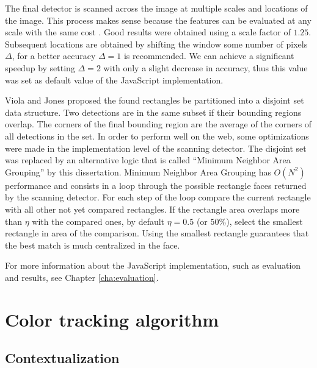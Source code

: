 The final detector is scanned across the image at multiple scales and locations of the image. This process makes sense because the features can be evaluated at any scale with the same cost \cite{Viola2001}. Good results were obtained using a scale factor of $1.25$. Subsequent locations are obtained by shifting the window some number of pixels $\Delta$, for a better accuracy $\Delta=1$ is recommended. We can achieve a significant speedup by setting $\Delta=2$ with only a slight decrease in accuracy, thus this value was set as default value of the JavaScript implementation.

Viola and Jones \cite{Viola2001} proposed the found rectangles be partitioned into a disjoint set data structure. Two detections are in the same subset if their bounding regions overlap. The corners of the final bounding region are the average of the corners of all detections in the set. In order to perform well on the web, some optimizations were made in the implementation level of the scanning detector. The disjoint set was replaced by an alternative logic that is called ``Minimum Neighbor Area Grouping'' by this dissertation. Minimum Neighbor Area Grouping has $O(N^2)$ performance \cite{black2007big} and consists in a loop through the possible rectangle faces returned by the scanning detector. For each step of the loop compare the current rectangle with all other not yet compared rectangles. If the rectangle area overlaps more than $\eta$ with the compared ones, by default $\eta=0.5$ (or $50\%$), select the smallest rectangle in area of the comparison. Using the smallest rectangle guarantees that the best match is much centralized in the face.

For more information about the JavaScript implementation, such as evaluation and results, see Chapter \ref{cha:evaluation}.



\section{Color tracking algorithm} %
\label{sec:tracking_library_for_the_web:color_tracking_algorithm}

\subsection{Contextualization} %
\label{sub:tracking_library_for_the_web:color_tracking_algorithm:contextualization}


